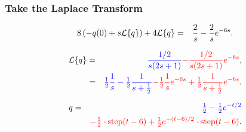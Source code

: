 \begin{frame}
  \frametitle{Take the Laplace Transform}

  \begin{eqnarray*}
    8\lp -q(0) + s \laplace{q} \rp + 4 \laplace{q} & = & \frac{2}{s} -
    \frac{2}{s} e^{-6s}.
  \end{eqnarray*}

  {
    \begin{eqnarray*}
      \laplace{q} & = & \blueText{\frac{1/2}{s(2s+1)}} \redText{- \frac{1/2}{s(2s+1)} e^{-6s}}, \\
      & = & \blueText{\half \frac{1}{s} - \half \frac{1}{s+\half}}
      \redText{- \half \frac{1}{s} e^{-6s} + \half \frac{1}{s+\half} e^{-6s}}.
    \end{eqnarray*}
  }

  {
    \begin{eqnarray*}
      q & = & {\color{blue}\mbox{$\frac{1}{2}$} - \mbox{$\frac{1}{2}$} e^{-t/2}} \\
      & & {\color{red}- \mbox{$\frac{1}{2}$}\cdot\mathrm{step}(t-6)
                   + \mbox{$\frac{1}{2}$} e^{-(t-6)/2}\cdot\mathrm{step}(t-6)}.
    \end{eqnarray*}
  }


\end{frame}




